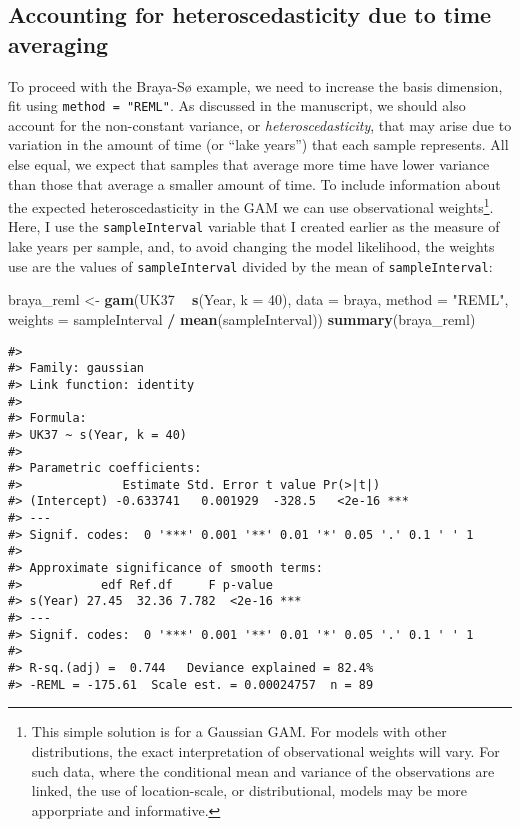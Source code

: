 \documentclass[12pt,]{article}
\newenvironment{Shaded}{\begin{snugshade}}{\end{snugshade}}
\newcommand{\DataTypeTok}[1]{\textcolor[rgb]{0.13,0.29,0.53}{#1}}
\newcommand{\DecValTok}[1]{\textcolor[rgb]{0.00,0.00,0.81}{#1}}
\newcommand{\KeywordTok}[1]{\textcolor[rgb]{0.13,0.29,0.53}{\textbf{#1}}}
\newcommand{\NormalTok}[1]{#1}
\newcommand{\OperatorTok}[1]{\textcolor[rgb]{0.81,0.36,0.00}{\textbf{#1}}}
\newcommand{\StringTok}[1]{\textcolor[rgb]{0.31,0.60,0.02}{#1}}
\begin{document}
\hypertarget{accounting-for-heteroscedasticity-due-to-time-averaging}{%
\subsection{Accounting for heteroscedasticity due to time
averaging}\label{accounting-for-heteroscedasticity-due-to-time-averaging}}

To proceed with the Braya-Sø example, we need to increase the basis
dimension, fit using \texttt{method\ =\ "REML"}. As discussed in the
manuscript, we should also account for the non-constant variance, or
\emph{heteroscedasticity}, that may arise due to variation in the amount
of time (or ``lake years'') that each sample represents. All else equal,
we expect that samples that average more time have lower variance than
those that average a smaller amount of time. To include information
about the expected heteroscedasticity in the GAM we can use
observational weights\footnote{This simple solution is for a Gaussian
  GAM. For models with other distributions, the exact interpretation of
  observational weights will vary. For such data, where the conditional
  mean and variance of the observations are linked, the use of
  location-scale, or distributional, models may be more apporpriate and
  informative.}. Here, I use the \texttt{sampleInterval} variable that I
created earlier as the measure of lake years per sample, and, to avoid
changing the model likelihood, the weights use are the values of
\texttt{sampleInterval} divided by the mean of \texttt{sampleInterval}:

\begin{Shaded}
\begin{Highlighting}[]
\NormalTok{braya_reml <-}\StringTok{ }\KeywordTok{gam}\NormalTok{(UK37 }\OperatorTok{~}\StringTok{ }\KeywordTok{s}\NormalTok{(Year, }\DataTypeTok{k =} \DecValTok{40}\NormalTok{), }\DataTypeTok{data =}\NormalTok{ braya,}
                  \DataTypeTok{method =} \StringTok{"REML"}\NormalTok{,}
                  \DataTypeTok{weights =}\NormalTok{ sampleInterval }\OperatorTok{/}\StringTok{ }\KeywordTok{mean}\NormalTok{(sampleInterval))}
\KeywordTok{summary}\NormalTok{(braya_reml)}
\end{Highlighting}
\end{Shaded}

\begin{verbatim}
#> 
#> Family: gaussian 
#> Link function: identity 
#> 
#> Formula:
#> UK37 ~ s(Year, k = 40)
#> 
#> Parametric coefficients:
#>              Estimate Std. Error t value Pr(>|t|)    
#> (Intercept) -0.633741   0.001929  -328.5   <2e-16 ***
#> ---
#> Signif. codes:  0 '***' 0.001 '**' 0.01 '*' 0.05 '.' 0.1 ' ' 1
#> 
#> Approximate significance of smooth terms:
#>           edf Ref.df     F p-value    
#> s(Year) 27.45  32.36 7.782  <2e-16 ***
#> ---
#> Signif. codes:  0 '***' 0.001 '**' 0.01 '*' 0.05 '.' 0.1 ' ' 1
#> 
#> R-sq.(adj) =  0.744   Deviance explained = 82.4%
#> -REML = -175.61  Scale est. = 0.00024757  n = 89
\end{verbatim}
\end{document}
